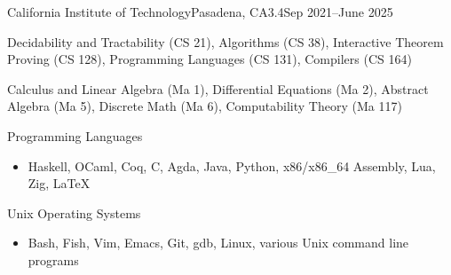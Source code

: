 \documentclass[a4paper]{article}
\begin{document}

    \begin{school}{California Institute of Technology}{Pasadena, CA}{3.4}{Sep 2021--June 2025}


        \item Decidability and Tractability (CS 21), Algorithms (CS 38), Interactive Theorem Proving (CS 128), Programming Languages (CS 131), Compilers (CS 164)
        \item Calculus and Linear Algebra (Ma 1), Differential Equations (Ma 2), Abstract Algebra (Ma 5), Discrete Math (Ma 6), Computability Theory (Ma 117)

    \end{school}


    \begin{skill}{Programming Languages}
      \begin{itemize}[nosep]
        \item Haskell, OCaml, Coq, C, Agda, Java, Python, x86/x86\_64 Assembly, Lua, Zig, \LaTeX{}
      \end{itemize}
    \end{skill}
    \vspace{-8pt}
    \begin{skill}{Unix Operating Systems}
      \begin{itemize}[nosep]
        \item Bash, Fish, Vim, Emacs, Git, gdb, Linux, various Unix command line programs
     \end{itemize}
    \end{skill}
    \vspace{-5pt}
\end{document}
